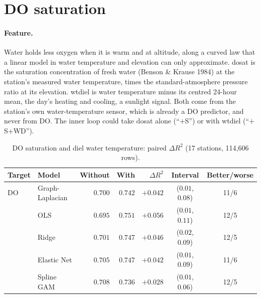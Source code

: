 \documentclass[11pt]{article}
\newcommand{\codeus}{\textunderscore\allowbreak}
\newcommand{\code}[1]{{\ttfamily\let\_\codeus #1}}
\begin{document}
\section{DO saturation}\label{sec:dosat}

\paragraph{Feature.} Water holds less oxygen when it is warm and at altitude, along a curved law
that a linear model in water temperature and elevation can only approximate. \code{do\_sat} is
the saturation concentration of fresh water (Benson \& Krause 1984) at the station's measured
water temperature, times the standard-atmosphere pressure ratio at its elevation.
\code{wt\_diel} is water temperature minus its centred 24-hour mean, the day's heating and
cooling, a sunlight signal. Both come from the station's own water-temperature sensor, which is
already a DO predictor, and never from DO. The inner loop could take \code{do\_sat} alone
(``$+$S'') or with \code{wt\_diel} (``$+$S$+$WD'').

\begin{table}[h]
\centering
\small
\caption{DO saturation and diel water temperature: paired $\Delta R^2$ (17 stations, 114{,}606
rows).}
\label{tab:dosat}
\begin{tabular}{ll rrrcc}
\toprule
Target & Model & Without & With & $\Delta R^2$ & Interval & Better/worse \\
\midrule
DO            & Graph-Laplacian & $0.700$ & $0.742$ & $\mathbf{+0.042}$ & ($0.01$, $0.08$) & 11/6 \\
              & OLS             & $0.695$ & $0.751$ & $\mathbf{+0.056}$ & ($0.01$, $0.11$) & 12/5 \\
              & Ridge           & $0.701$ & $0.747$ & $\mathbf{+0.046}$ & ($0.02$, $0.09$) & 12/5 \\
              & Elastic Net     & $0.705$ & $0.747$ & $\mathbf{+0.042}$ & ($0.01$, $0.09$) & 11/6 \\
              & Spline GAM      & $0.708$ & $0.736$ & $\mathbf{+0.028}$ & ($0.01$, $0.06$) & 12/5 \\
\bottomrule
\end{tabular}
\end{table}
\end{document}
